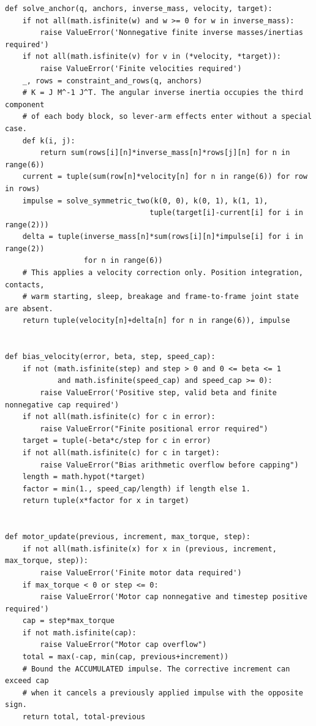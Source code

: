 \begin{verbatim}
def solve_anchor(q, anchors, inverse_mass, velocity, target):
    if not all(math.isfinite(w) and w >= 0 for w in inverse_mass):
        raise ValueError('Nonnegative finite inverse masses/inertias required')
    if not all(math.isfinite(v) for v in (*velocity, *target)):
        raise ValueError('Finite velocities required')
    _, rows = constraint_and_rows(q, anchors)
    # K = J M^-1 J^T. The angular inverse inertia occupies the third component
    # of each body block, so lever-arm effects enter without a special case.
    def k(i, j):
        return sum(rows[i][n]*inverse_mass[n]*rows[j][n] for n in range(6))
    current = tuple(sum(row[n]*velocity[n] for n in range(6)) for row in rows)
    impulse = solve_symmetric_two(k(0, 0), k(0, 1), k(1, 1),
                                 tuple(target[i]-current[i] for i in range(2)))
    delta = tuple(inverse_mass[n]*sum(rows[i][n]*impulse[i] for i in range(2))
                  for n in range(6))
    # This applies a velocity correction only. Position integration, contacts,
    # warm starting, sleep, breakage and frame-to-frame joint state are absent.
    return tuple(velocity[n]+delta[n] for n in range(6)), impulse


def bias_velocity(error, beta, step, speed_cap):
    if not (math.isfinite(step) and step > 0 and 0 <= beta <= 1
            and math.isfinite(speed_cap) and speed_cap >= 0):
        raise ValueError('Positive step, valid beta and finite nonnegative cap required')
    if not all(math.isfinite(c) for c in error):
        raise ValueError("Finite positional error required")
    target = tuple(-beta*c/step for c in error)
    if not all(math.isfinite(c) for c in target):
        raise ValueError("Bias arithmetic overflow before capping")
    length = math.hypot(*target)
    factor = min(1., speed_cap/length) if length else 1.
    return tuple(x*factor for x in target)


def motor_update(previous, increment, max_torque, step):
    if not all(math.isfinite(x) for x in (previous, increment, max_torque, step)):
        raise ValueError('Finite motor data required')
    if max_torque < 0 or step <= 0:
        raise ValueError('Motor cap nonnegative and timestep positive required')
    cap = step*max_torque
    if not math.isfinite(cap):
        raise ValueError("Motor cap overflow")
    total = max(-cap, min(cap, previous+increment))
    # Bound the ACCUMULATED impulse. The corrective increment can exceed cap
    # when it cancels a previously applied impulse with the opposite sign.
    return total, total-previous



\end{verbatim}

